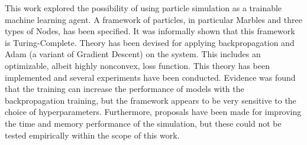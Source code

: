 This work explored the possibility of using particle simulation as a trainable machine learning agent.
A framework of particles, in particular Marbles and three types of Nodes, has been specified.
It was informally shown that this framework is Turing-Complete.
Theory has been devised for applying backpropagation and Adam (a variant of Gradient Descent) on the system.
This includes an optimizable, albeit highly nonconvex, loss function.
This theory has been implemented and several experiments have been conducted.
Evidence was found that the training can increase the performance of models with the backpropagation training,
but the framework appears to be very sensitive to the choice of hyperparameters.
Furthermore, proposals have been made for improving the time and memory performance of the simulation,
but these could not be tested empirically within the scope of this work.
